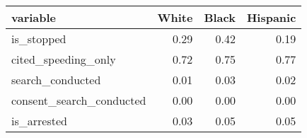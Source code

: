 \begin{table}[ht]
\centering
\begin{tabular}{lrrr}
  \hline
variable & White & Black & Hispanic \\ 
  \hline
is\_stopped & 0.29 & 0.42 & 0.19 \\ 
  cited\_speeding\_only & 0.72 & 0.75 & 0.77 \\ 
  search\_conducted & 0.01 & 0.03 & 0.02 \\ 
  consent\_search\_conducted & 0.00 & 0.00 & 0.00 \\ 
  is\_arrested & 0.03 & 0.05 & 0.05 \\ 
   \hline
\end{tabular}
\end{table}
